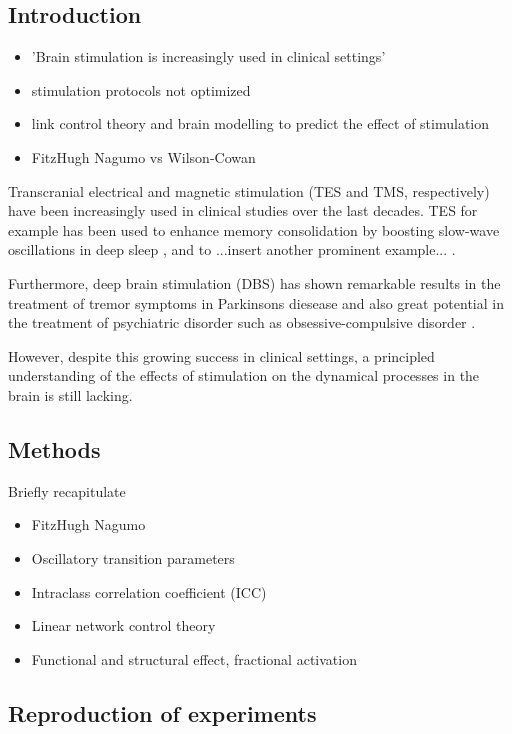 

\subsection{Introduction}
\begin{itemize}
 \item 
  'Brain stimulation is increasingly used in clinical settings'
 \item
  stimulation protocols not optimized
 \item
  link control theory and brain modelling to predict the effect of stimulation 
 \item
  FitzHugh Nagumo vs Wilson-Cowan
\end{itemize}

Transcranial electrical and magnetic stimulation  (TES and TMS, respectively) have been increasingly used in clinical studies over the last decades. TES
for example has been used to enhance memory consolidation by boosting slow-wave oscillations in deep sleep \cite{}, and to ...insert another prominent example...
\cite{}.

Furthermore, deep brain stimulation (DBS) has shown remarkable results in the treatment of tremor symptoms in Parkinsons diesease \cite{} and also great potential 
in the treatment of psychiatric disorder such as obsessive-compulsive disorder \cite{}.

However, despite this growing success in clinical settings, a principled understanding of the effects of stimulation on the dynamical processes in the brain 
is still lacking. 



\subsection{Methods}

Briefly recapitulate 
\begin{itemize}
 \item 
  FitzHugh Nagumo
 \item
  Oscillatory transition parameters
 \item
  Intraclass correlation coefficient (ICC)
 \item
  Linear network control theory
 \item
  Functional and structural effect, fractional activation
\end{itemize}

\subsection{Reproduction of experiments}

